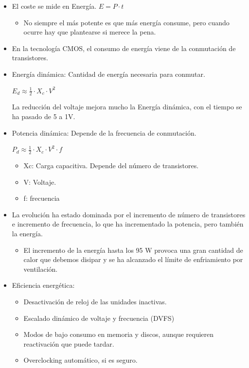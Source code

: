 \documentclass[12pt, twoside, openright]{report} %
\begin{document}
  \begin{itemize}
  
  \item
    El coste se mide en Energía. \(E= P \cdot t\)

    \begin{itemize}
    
    \item
      No siempre el más potente es que más energía consume, pero cuando
      ocurre hay que plantearse si merece la pena.
    \end{itemize}
  \item
    En la tecnología CMOS, el consumo de energía viene de la conmutación
    de transistores.
  \item
    Energía dinámica: Cantidad de energía necesaria para conmutar.

    
    
      \(E_d \approx \frac 1 2 \cdot X_c\cdot V^2\)

      La reducción del voltaje mejora mucho la Energía dinámica, con el
      tiempo se ha pasado de 5 a 1V.

    \item
    Potencia dinámica: Depende de la frecuencia de conmutación.

    
    
      \(P_d \approx \frac 1 2 \cdot X_c\cdot V^2\cdot f\)

    \begin{itemize}
      
      \item
        Xc: Carga capacitiva. Depende del número de transistores.
      \item
        V: Voltaje.
      \item
        f: frecuencia
      \end{itemize}
    \item
    La evolución ha estado dominada por el incremento de número de
    transistores e incremento de frecuencia, lo que ha incrementado la
    potencia, pero también la energía.

    \begin{itemize}
    
    \item
      El incremento de la energía hasta los 95 W provoca una gran
      cantidad de calor que debemos disipar y se ha alcanzado el límite
      de enfriamiento por ventilación.
    \end{itemize}
  \item
    Eficiencia energética:

    \begin{itemize}
    
    \item
      Desactivación de reloj de las unidades inactivas.
    \item
      Escalado dinámico de voltaje y frecuencia (DVFS)
    \item
      Modos de bajo consumo en memoria y discos, aunque requieren
      reactivación que puede tardar.
    \item
      Overclocking automático, si es seguro.
    \end{itemize}
  \end{itemize}
\end{document}
